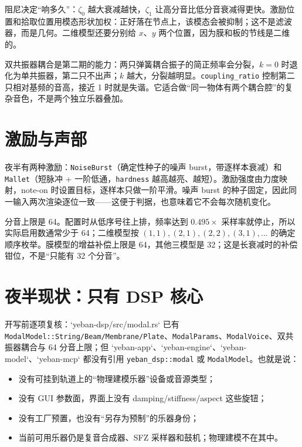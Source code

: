 阻尼决定“响多久”：$\zeta_0$ 越大衰减越快，$\zeta_1$ 让高分音比低分音衰减得更快。激励位置和拾取位置用模态形状加权：正好落在节点上，该模态会被抑制；这不是滤波器，而是几何。二维模型还要分别给 $x$、$y$ 两个位置，因为膜和板的节线是二维的。

双共振器耦合是第二期的能力：两只弹簧耦合振子的简正频率会分裂，$k=0$ 时退化为单共振器，第二只不出声；$k$ 越大，分裂越明显。\texttt{coupling\_ratio} 控制第二只相对基频的音高，接近 1 时就是失谐。它适合做“同一物体有两个耦合腔”的复杂音色，不是两个独立乐器叠加。

\section{激励与声部}

夜半有两种激励：\texttt{NoiseBurst}（确定性种子的噪声 burst，带逐样本衰减）和 \texttt{Mallet}（短脉冲 + 一阶低通，\texttt{hardness} 越高越亮、越短）。激励强度由力度映射，note-on 时设置目标，逐样本只做一阶平滑。噪声 burst 的种子固定，因此同一输入两次渲染逐位一致——这便于判据，也意味着它不会每次随机变化。

分音上限是 64。配置时从低序号往上排，频率达到 $0.495\times$ 采样率就停止，所以实际启用数通常少于 64；二维模型按 $(1,1),(2,1),(2,2),(3,1),\dots$ 的确定顺序枚举。膜模型的增益补偿上限是 64，其他三模型是 32；这是长衰减时的补偿钳位，不是“只能有 32 个分音”。

\section{夜半现状：只有 DSP 核心}

开写前逐项复核：`yeban-dsp/src/modal.rs` 已有 \texttt{ModalModel::String/\allowbreak Beam/\allowbreak Membrane/\allowbreak Plate}、\texttt{ModalParams}、\texttt{ModalVoice}、双共振器耦合与 64 分音上限；但 `yeban-app`、`yeban-engine`、`yeban-model`、`yeban-mcp` 都没有引用 \texttt{yeban\_dsp::modal} 或 \texttt{ModalModel}。也就是说：

\begin{itemize}
  \item 没有可挂到轨道上的“物理建模乐器”设备或音源类型；
  \item 没有 GUI 参数面，界面上没有 damping/stiffness/aspect 这些旋钮；
  \item 没有工厂预置，也没有“另存为预制”的乐器身份；
  \item 当前可用乐器仍是复音合成器、SFZ 采样器和鼓机；物理建模不在其中。
\end{itemize}

